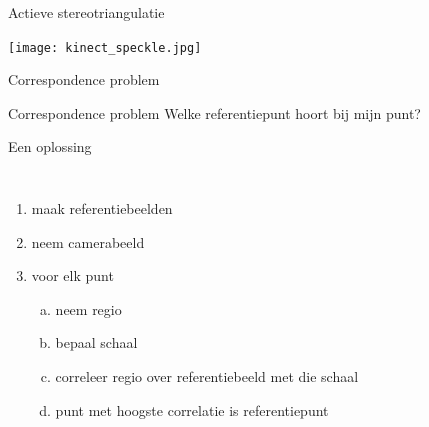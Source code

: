 \begin{frame}{Actieve stereotriangulatie}\vspace{-4pt}
\centerline{\texttt{[image: kinect\_speckle.jpg]}}
\end{frame}


\begin{frame}{Correspondence problem}

\begin{block}{Correspondence problem}
Welke referentiepunt hoort bij mijn punt?
\end{block}
\vfill
\pause
{\large Een oplossing}
\begin{columns}[t]
\begin{enumerate}
\item<+-> maak referentiebeelden
\item<+-> neem camerabeeld
\item<+-> voor elk punt
\begin{enumerate}[a.]
\item<+-> neem regio
\item<+-> bepaal schaal
\item<+-> correleer regio over referentiebeeld met die schaal
\item<+-> punt met hoogste correlatie is referentiepunt
\end{enumerate}
\end{enumerate}

\end{columns}
\end{frame}
